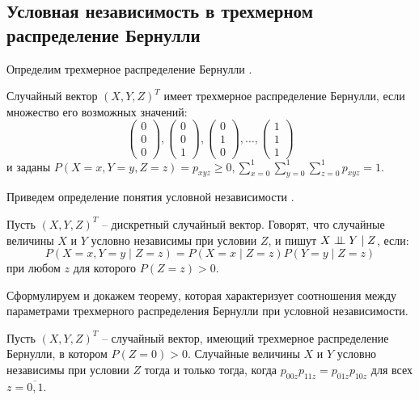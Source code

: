 \begin{centering}
    \subsection{Условная независимость в трехмерном распределение Бернулли}\label{ci_and_bernoulli}
\end{centering}
Определим трехмерное распределение Бернулли \cite{Dai2013, Teugels1990}.
\begin{definition}
    Случайный вектор $(X,Y,Z)^T$ имеет трехмерное распределение Бернулли,
    если множество его возможных значений:
    $$
        \begin{pmatrix}
            0 \\
            0 \\
            0
        \end{pmatrix},
        \begin{pmatrix}
            0 \\
            0 \\
            1
        \end{pmatrix},
        \begin{pmatrix}
            0 \\
            1 \\
            0
        \end{pmatrix}, \ldots, \begin{pmatrix}
            1 \\
            1 \\
            1
        \end{pmatrix}
    $$ и заданы $P(X=x,Y=y,Z=z)=p_{xyz} \geq 0,  \sum_{x=0}^1 \sum_{y=0}^1 \sum_{z=0}^1 p_{xyz} =1$.
\end{definition}
Приведем определение понятия условной независимости \cite{Lauritzen1996}.
\begin{definition}\label{cond_ind_def}
    Пусть $(X,Y,Z)^T$ -- дискретный случайный вектор.
    Говорят, что случайные величины $X$ и $Y$ условно независимы при условии $Z$,
    и пишут $X \perp\!\!\!\perp Y \mid Z$, если:
    $$
    P(X=x, Y=y \mid Z = z) = P(X=x \mid Z = z) P(Y=y \mid Z = z)
    $$
    при любом $z$ для которого $P(Z=z)>0$.
\end{definition}
Сформулируем и докажем теорему, которая характеризует соотношения между параметрами трехмерного распределения Бернулли при условной независимости.
\begin{theorem}\label{thm1}
    Пусть $(X,Y,Z)^T$ -- случайный вектор, имеющий трехмерное распределение Бернулли, в котором $P(Z=0)>0$.
    Случайные величины $X$ и $Y$ условно независимы при условии $Z$ тогда и только тогда, когда
    $p_{00z}p_{11z}=p_{01z}p_{10z}$ для всех $z=\overline{0,1}$.
\end{theorem}
